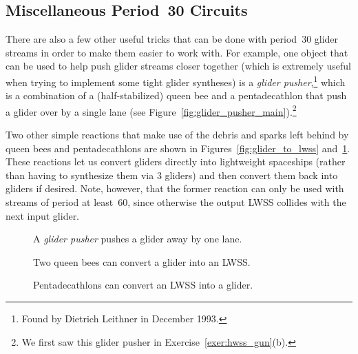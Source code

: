 \subsection{Miscellaneous Period~30 Circuits}\label{sec:p30_misc_circuits}

There are also a few other useful tricks that can be done with period~$30$ glider streams in order to make them easier to work with. For example, one object that can be used to help push glider streams closer together (which is extremely useful when trying to implement some tight glider syntheses) is a \emph{glider pusher},\footnote{Found by Dietrich Leithner in December 1993.} which is a combination of a (half-stabilized) queen bee and a pentadecathlon that push a glider over by a single lane (see Figure~\ref{fig:glider_pusher_main}).\footnote{We first saw this glider pusher in Exercise~\ref{exer:hwss_gun}(b).}

Two other simple reactions that make use of the debris and sparks left behind by queen bees and pentadecathlons are shown in Figures~\ref{fig:glider_to_lwss} and~\ref{fig:lwss_to_glider}. These reactions let us convert gliders directly into lightweight spaceships (rather than having to synthesize them via $3$ gliders) and then convert them back into gliders if desired. Note, however, that the former reaction can only be used with streams of period at least~$60$, since otherwise the output LWSS collides with the next input glider.

\begin{figure}
	\centering
	\begin{minipage}{0.27\textwidth}
		\centering
		\caption{A \emph{glider pusher} pushes a glider away by one lane.}\label{fig:glider_pusher_main}
	\end{minipage}\quad
	\begin{minipage}{0.4\textwidth}
		\centering\vspace*{-0.1cm}
		\caption{Two queen bees can convert a glider into an LWSS.}\label{fig:glider_to_lwss}
	\end{minipage}\quad
	\begin{minipage}{0.27\textwidth}
		\centering\vspace*{0.05cm}
		\caption{Pentadecathlons can convert an LWSS into a glider.}\label{fig:lwss_to_glider}
	\end{minipage}
\end{figure}

